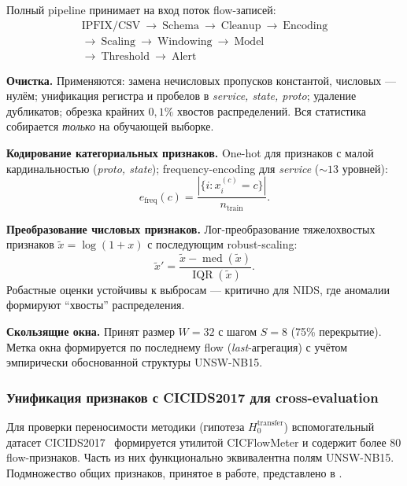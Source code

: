 Полный pipeline принимает на вход поток flow-записей:
\[
\boxed{
\begin{array}{l}
\text{IPFIX/CSV}\ \to\ \text{Schema}\ \to\ \text{Cleanup}\ \to\ \text{Encoding}\\[2pt]
\to\ \text{Scaling}\ \to\ \text{Windowing}\ \to\ \text{Model}\\[2pt]
\to\ \text{Threshold}\ \to\ \text{Alert}
\end{array}
}
\]

\textbf{Очистка.} Применяются: замена нечисловых пропусков константой,
числовых --- нулём; унификация регистра и пробелов в
\emph{service, state, proto}; удаление дубликатов; обрезка крайних
\(0{,}1\%\) хвостов распределений. Вся статистика собирается
\emph{только} на обучающей выборке.

\textbf{Кодирование категориальных признаков.} One-hot для признаков
с малой кардинальностью (\emph{proto, state}); frequency-encoding
для \emph{service} (\(\sim 13\) уровней):
\begin{equation}
e_{\text{freq}}(c) = \frac{|\{i : x_i^{(c)} = c\}|}{n_{\text{train}}}.
\label{eq:freq-enc}
\end{equation}

\textbf{Преобразование числовых признаков.} Лог-преобразование
тяжелохвостых признаков \(\tilde{x} = \log(1 + x)\) с последующим
robust-scaling:
\begin{equation}
\tilde{x}' = \frac{\tilde{x} - \operatorname{med}(\tilde{x})}
                  {\operatorname{IQR}(\tilde{x})}.
\label{eq:robust-scaler}
\end{equation}
Робастные оценки устойчивы к выбросам --- критично для NIDS,
где аномалии формируют ``хвосты'' распределения.

\textbf{Скользящие окна.} Принят размер \(W = 32\) с шагом
\(S = 8\) (75\% перекрытие). Метка окна формируется
по последнему flow (\emph{last}-агрегация) с учётом эмпирически
обоснованной структуры UNSW-NB15.

\subsubsection{Унификация признаков с CICIDS2017 для cross-evaluation}

Для проверки переносимости методики (гипотеза $H_0^{\text{transfer}}$)
вспомогательный датасет CICIDS2017~\cite{sharafaldin2018toward}
формируется утилитой CICFlowMeter и содержит более 80 flow-признаков.
Часть из них функционально эквивалентна полям UNSW-NB15.
Подмножество общих признаков, принятое в работе, представлено в
.

